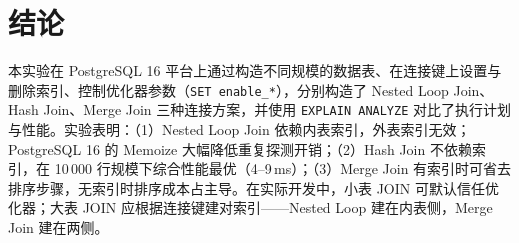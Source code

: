 \documentclass[12pt, a4paper]{academics}
\begin{document}
\section{结论}

本实验在 PostgreSQL 16 平台上通过构造不同规模的数据表、在连接键上设置与删除索引、控制优化器参数（\texttt{SET enable\_*}），分别构造了 Nested Loop Join、Hash Join、Merge Join 三种连接方案，并使用 \texttt{EXPLAIN ANALYZE} 对比了执行计划与性能。实验表明：（1）Nested Loop Join 依赖内表索引，外表索引无效；PostgreSQL 16 的 Memoize 大幅降低重复探测开销；（2）Hash Join 不依赖索引，在 10\,000 行规模下综合性能最优（4--9\,ms）；（3）Merge Join 有索引时可省去排序步骤，无索引时排序成本占主导。在实际开发中，小表 JOIN 可默认信任优化器；大表 JOIN 应根据连接键建对索引——Nested Loop 建在内表侧，Merge Join 建在两侧。
\end{document}
